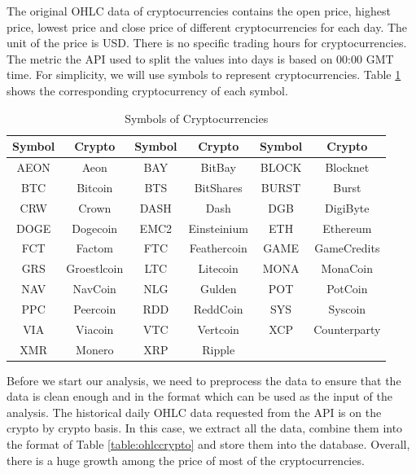\documentclass[11pt]{article} %
\theoremstyle{plain}
\theoremstyle{definition}
\begin{document}
The original OHLC data of cryptocurrencies contains the open price, highest price, lowest price and close price of different cryptocurrencies for each day. The unit of the price is USD. There is no specific trading hours for cryptocurrencies. The metric the API used to split the values into days is based on 00:00 GMT time. For simplicity, we will use symbols to represent cryptocurrencies. Table \ref{table:symbolcrypto} shows the corresponding cryptocurrency of each symbol.

{
  \begin{table}[ht]
    \centering
    \small
    \begin{tabular}{|c|c|c|c|c|c|}
        \hline
        Symbol & Crypto & Symbol & Crypto & Symbol & Crypto \\
        \hline
        AEON & Aeon & BAY & BitBay & BLOCK & Blocknet \\
        BTC & Bitcoin & BTS & BitShares & BURST & Burst \\
        CRW & Crown & DASH & Dash & DGB & DigiByte \\
        DOGE & Dogecoin & EMC2 & Einsteinium & ETH & Ethereum \\
        FCT & Factom & FTC & Feathercoin & GAME & GameCredits \\
        GRS & Groestlcoin & LTC & Litecoin & MONA & MonaCoin \\
        NAV & NavCoin & NLG & Gulden & POT & PotCoin \\
        PPC & Peercoin & RDD & ReddCoin & SYS & Syscoin \\
        VIA & Viacoin & VTC & Vertcoin & XCP & Counterparty \\
        XMR & Monero & XRP & Ripple & & \\
        \hline
    \end{tabular}
    \caption{Symbols of Cryptocurrencies}
    \label{table:symbolcrypto}
  \end{table}
}

Before we start our analysis, we need to preprocess the data to ensure that the data is clean enough and in the format which can be used as the input of the analysis. The historical daily OHLC data requested from the API is on the crypto by crypto basis. In this case, we extract all the data, combine them into the format of Table \ref{table:ohlccrypto} and store them into the database. Overall, there is a huge growth among the price of most of the cryptocurrencies.
\end{document}
